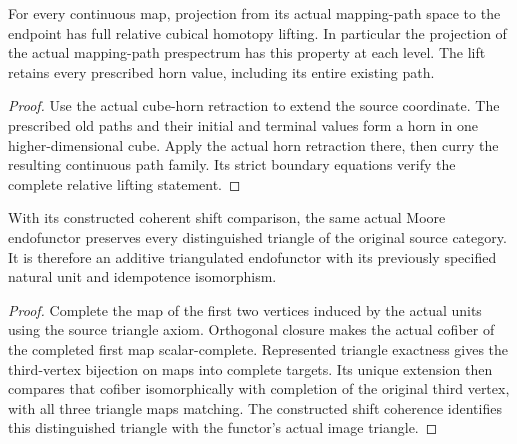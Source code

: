 \begin{proposition}
  \label{prop:actual-mapping-path-relative-cubical-lifting}
  \leanok
  For every continuous map, projection from its actual mapping-path space to the endpoint has full relative cubical homotopy lifting. In particular the projection of the actual mapping-path prespectrum has this property at each level. The lift retains every prescribed horn value, including its entire existing path.
\end{proposition}
\begin{proof}
  Use the actual cube-horn retraction to extend the source coordinate. The prescribed old paths and their initial and terminal values form a horn in one higher-dimensional cube. Apply the actual horn retraction there, then curry the resulting continuous path family. Its strict boundary equations verify the complete relative lifting statement.
  \leanok
\end{proof}

\begin{proposition}
  \label{prop:actual-moore-exact-functor}
  \leanok
  With its constructed coherent shift comparison, the same actual Moore endofunctor preserves every distinguished triangle of the original source category. It is therefore an additive triangulated endofunctor with its previously specified natural unit and idempotence isomorphism.
\end{proposition}
\begin{proof}
  Complete the map of the first two vertices induced by the actual units using the source triangle axiom. Orthogonal closure makes the actual cofiber of the completed first map scalar-complete. Represented triangle exactness gives the third-vertex bijection on maps into complete targets. Its unique extension then compares that cofiber isomorphically with completion of the original third vertex, with all three triangle maps matching. The constructed shift coherence identifies this distinguished triangle with the functor's actual image triangle.
  \leanok
\end{proof}

